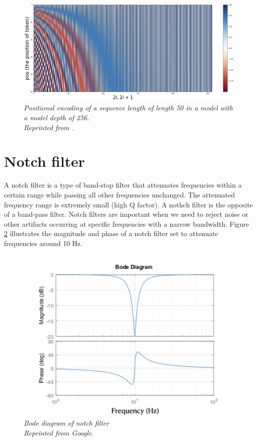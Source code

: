 \begin{figure}[H]
  \centering
  \caption[Positional encoding of a sequence length of length 50 in a model with a model depth of 256.]{\emph{Positional encoding of a sequence length of length 50 in a model with a model depth of 256. \\ Reprinted from \citeauthor{tamura_2021} \citeyear{tamura_2021}.}}\label{fig:attention_7}
  \includegraphics[scale = 0.15]{figures/positional_encoding.jpg}
\end{figure}

\section{Notch filter}

A notch filter is a type of band-stop filter that attenuates frequencies within a certain range while passing all other frequencies unchanged. The attenuated frequency range is extremely small (high Q factor). A nothch filter is the opposite of a band-pass filter. Notch filters are important when we need to reject noise or other artifacts occurring at specific frequencies with a narrow bandwidth. Figure \ref{fig:notch} illustrates the magnitude and phase of a notch filter set to attenuate frequencies around 10 Hz.

\begin{figure}[H]
  \centering
  \caption[Bode diagram of notch filter]{\emph{Bode diagram of notch filter \\ Reprinted from Google.}}\label{fig:notch}
  \includegraphics[scale = 0.2]{figures/notch.jpg}
\end{figure}

